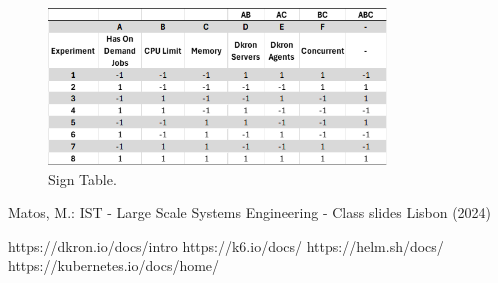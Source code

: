 \documentclass[runningheads]{llncs}
\begin{document}
\begin{figure}[H]
    \centering
    \includegraphics[width=0.8\textwidth]{media/FullFactorTable_onesminusones.png}
    \caption{Sign Table.}
    \label{fig:fullconvertedoriginalfactors}
\end{figure}


%
%
% 
% 
%
\begin{thebibliography}{8}

Matos, M.: IST - Large Scale Systems Engineering - Class slides
Lisbon (2024)

https://dkron.io/docs/intro
https://k6.io/docs/
https://helm.sh/docs/
https://kubernetes.io/docs/home/
\end{thebibliography}
\end{document}
